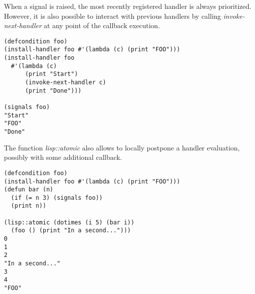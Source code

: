 When a signal is raised, the most recently registered handler is always prioritized.
However, it is also possible to interact with previous handlers by calling
{\em invoke-next-handler} at any point of the callback execution.

\begin{verbatim}
(defcondition foo)
(install-handler foo #'(lambda (c) (print "FOO")))
(install-handler foo
  #'(lambda (c)
      (print "Start")
      (invoke-next-handler c)
      (print "Done")))

(signals foo)
"Start"
"FOO"
"Done"
\end{verbatim}

The function {\em lisp::atomic} also allows to locally postpone
a handler evaluation, possibly with some additional callback.

\begin{verbatim}
(defcondition foo)
(install-handler foo #'(lambda (c) (print "FOO")))
(defun bar (n)
  (if (= n 3) (signals foo))
  (print n))

(lisp::atomic (dotimes (i 5) (bar i))
  (foo () (print "In a second...")))
0
1
2
"In a second..."
3
4
"FOO"
\end{verbatim}


